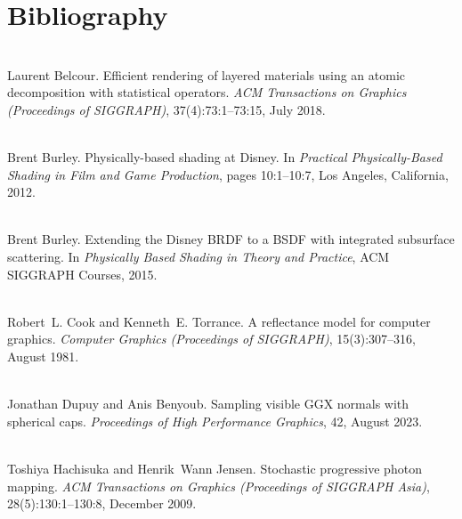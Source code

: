 \chapter{Bibliography}
\hypertarget{citelist}{}\label{citelist}

\begin{DoxyDescription}
\item[\label{citelist_CITEREF_Belcour:2018:Efficient}%
\Hypertarget{citelist_CITEREF_Belcour:2018:Efficient}%
\mbox{[}1\mbox{]}]\hfill \\
Laurent Belcour. Efficient rendering of layered materials using an atomic decomposition with statistical operators. {\itshape ACM Transactions on Graphics (Proceedings of SIGGRAPH)}, 37(4)\+:73\+:1--73\+:15, July 2018. 


\item[\label{citelist_CITEREF_Burley:2012:Physicallybased}%
\Hypertarget{citelist_CITEREF_Burley:2012:Physicallybased}%
\mbox{[}2\mbox{]}]\hfill \\
Brent Burley. Physically-\/based shading at Disney. In {\itshape Practical Physically-\/\+Based Shading in Film and Game Production}, pages 10\+:1--10\+:7, Los Angeles, California, 2012.


\item[\label{citelist_CITEREF_Burley:2015:Extending}%
\Hypertarget{citelist_CITEREF_Burley:2015:Extending}%
\mbox{[}3\mbox{]}]\hfill \\
Brent Burley. Extending the Disney BRDF to a BSDF with integrated subsurface scattering. In {\itshape Physically Based Shading in Theory and Practice}, ACM SIGGRAPH Courses, 2015.


\item[\label{citelist_CITEREF_Cook:1981:Reflectance}%
\Hypertarget{citelist_CITEREF_Cook:1981:Reflectance}%
\mbox{[}4\mbox{]}]\hfill \\
Robert~L. Cook and Kenneth~E. Torrance. A reflectance model for computer graphics. {\itshape Computer Graphics (Proceedings of SIGGRAPH)}, 15(3)\+:307--316, August 1981. 


\item[\label{citelist_CITEREF_Dupuy:2023:Sampling}%
\Hypertarget{citelist_CITEREF_Dupuy:2023:Sampling}%
\mbox{[}5\mbox{]}]\hfill \\
Jonathan Dupuy and Anis Benyoub. Sampling visible GGX normals with spherical caps. {\itshape Proceedings of High Performance Graphics}, 42, August 2023. 


\item[\label{citelist_CITEREF_Hachisuka:2009:Stochastic}%
\Hypertarget{citelist_CITEREF_Hachisuka:2009:Stochastic}%
\mbox{[}6\mbox{]}]\hfill \\
Toshiya Hachisuka and Henrik~Wann Jensen. Stochastic progressive photon mapping. {\itshape ACM Transactions on Graphics (Proceedings of SIGGRAPH Asia)}, 28(5)\+:130\+:1--130\+:8, December 2009. 



\end{DoxyDescription}
